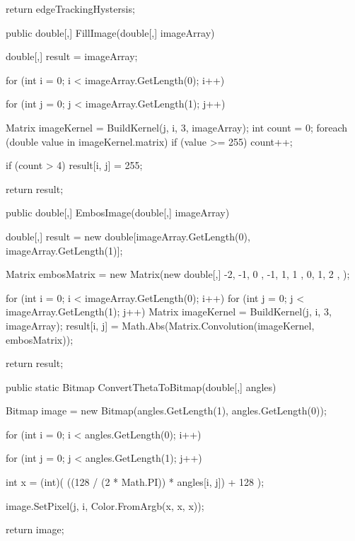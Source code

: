 \begin{flushleft}
\begin{cscode}
{{{            return edgeTrackingHystersis;
        }
        
        public double[,] FillImage(double[,] imageArray)
        {
            double[,] result = imageArray;

            for (int i = 0; i < imageArray.GetLength(0); i++)
            {
                for (int j = 0; j < imageArray.GetLength(1); j++)
                {
                    Matrix imageKernel = BuildKernel(j, i, 3, imageArray);
                    int count = 0;
                    foreach (double value in imageKernel.matrix)
                    {
                        if (value >= 255) count++;
                    }

                    if (count > 4) result[i, j] = 255;
                }
            }

            return result;
        }
        
        public double[,] EmbosImage(double[,] imageArray)
        {
            double[,] result = new double[imageArray.GetLength(0), imageArray.GetLength(1)];

            Matrix embosMatrix = new Matrix(new double[,] {
                { -2, -1, 0 },
                { -1,  1, 1 },
                {  0,  1, 2 },
            });

            for (int i = 0; i < imageArray.GetLength(0); i++)
            {
                for (int j = 0; j < imageArray.GetLength(1); j++)
                {
                    Matrix imageKernel = BuildKernel(j, i, 3, imageArray);
                    result[i, j] = Math.Abs(Matrix.Convolution(imageKernel, embosMatrix));
                }
            }

            return result;
        }

        public static Bitmap ConvertThetaToBitmap(double[,] angles)
        {
            Bitmap image = new Bitmap(angles.GetLength(1), angles.GetLength(0));

            for (int i = 0; i < angles.GetLength(0); i++)
            {
                for (int j = 0; j < angles.GetLength(1); j++)
                {
                    int x = (int)(
                        ((128 / (2 * Math.PI)) * angles[i, j]) + 128
                    );

                    image.SetPixel(j, i, Color.FromArgb(x, x, x));
                }
            }

            return image;

        }

}}
\end{cscode}
\end{flushleft}
